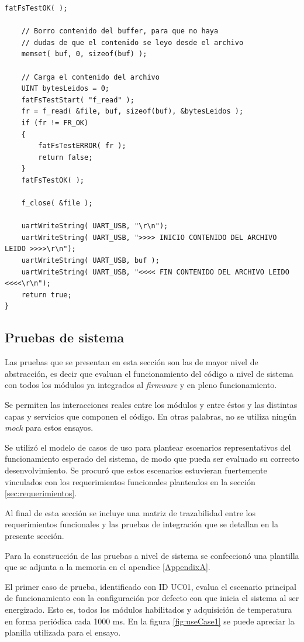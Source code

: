 \begin{lstlisting}[caption={Código para las puebas funcionales para el módulo de almacenamiento.},label={lst:funcional}]
	fatFsTestOK( );

	// Borro contenido del buffer, para que no haya 
	// dudas de que el contenido se leyo desde el archivo
	memset( buf, 0, sizeof(buf) );

	// Carga el contenido del archivo
	UINT bytesLeidos = 0;
	fatFsTestStart( "f_read" );
	fr = f_read( &file, buf, sizeof(buf), &bytesLeidos );
	if (fr != FR_OK)
	{
		fatFsTestERROR( fr );
		return false;
	}
	fatFsTestOK( );

	f_close( &file );

	uartWriteString( UART_USB, "\r\n");
	uartWriteString( UART_USB, ">>>> INICIO CONTENIDO DEL ARCHIVO LEIDO >>>>\r\n");
	uartWriteString( UART_USB, buf );
	uartWriteString( UART_USB, "<<<< FIN CONTENIDO DEL ARCHIVO LEIDO <<<<\r\n");
	return true;
}
\end{lstlisting}


\subsection{Pruebas de sistema}
\label{subsec:pruebasSistema}

Las pruebas que se presentan en esta sección son las de mayor nivel de abstracción, es decir que evaluan el funcionamiento del código a nivel de sistema con todos los módulos ya integrados al \textit{firmware} y en pleno funcionamiento.

Se permiten las interacciones reales entre los módulos y entre éstos y las distintas capas y servicios que componen el código.  En otras palabras, no se utiliza ningún \textit{mock} para estos ensayos.

Se utilizó el modelo de casos de uso para plantear escenarios representativos del funcionamiento esperado del sistema, de modo que pueda ser evaluado su correcto desenvolvimiento.  Se procuró que estos escenarios estuvieran fuertemente vinculados con los requerimientos funcionales planteados en la sección \ref{sec:requerimientos}.

Al final de esta sección se incluye una matriz de trazabilidad entre los requerimientos funcionales y las pruebas de integración que se detallan en la presente sección.  

Para la construcción de las pruebas a nivel de sistema se confeccionó una plantilla que se adjunta a la memoria en el apendice \ref{AppendixA}.

El primer caso de prueba, identificado con ID UC01, evalua el escenario principal de funcionamiento con la configuración por defecto con que inicia el sistema al ser energizado. Esto es, todos los módulos habilitados y adquisición de temperatura en forma periódica cada 1000 ms.  En la figura \ref{fig:useCase1} se puede apreciar la planilla utilizada para el ensayo. 

